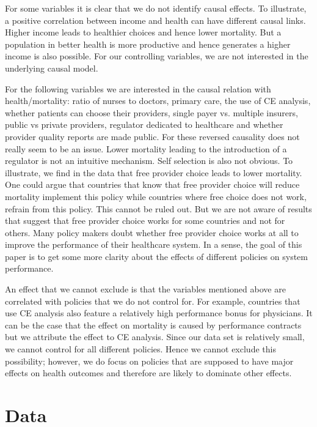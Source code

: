 \documentclass{article}
\begin{document}
For some variables it is clear that we do not identify causal effects. To illustrate, a positive correlation between income and health can have different causal links. Higher income leads to healthier choices and hence lower mortality. But a population in better health is more productive and hence generates a higher income is also possible. For our controlling variables, we are not interested in the underlying causal model.

For the following variables we are interested in the causal relation with health/mortality: ratio of nurses to doctors, primary care, the use of CE analysis, whether patients can choose their providers, single payer vs. multiple insurers, public vs private providers, regulator dedicated to healthcare and whether provider quality reports are made public. For these reversed causality does not really seem to be an issue. Lower mortality leading to the introduction of a regulator is not an intuitive mechanism. Self selection is also not obvious. To illustrate, we find in the data that free provider choice leads to lower mortality. One could argue that countries that know that free provider choice will reduce mortality implement this policy while countries where free choice does not work, refrain from this policy. This cannot be ruled out. But we are not aware of results that suggest that free provider choice works for some countries and not for others. Many policy makers doubt whether free provider choice works at all to improve the performance of their healthcare system. In a sense, the goal of this paper is to get some more clarity about the effects of different policies on system performance.

An effect that we cannot exclude is that the variables mentioned above are correlated with policies that we do not control for. For example, countries that use CE analysis also feature a relatively high performance bonus for physicians. It can be the case that the effect on mortality is caused by performance contracts but we attribute the effect to CE analysis. Since our data set is relatively small, we cannot control for all different policies. Hence we cannot exclude this possibility; however, we do focus on policies that are supposed to have major effects on health outcomes and therefore are likely to dominate other effects.


\section{Data}
\label{sec:orgb0fa0da}
\end{document}
